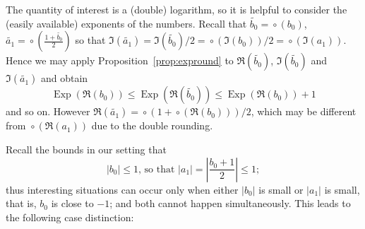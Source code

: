 \documentclass [11pt]{article}
\newcommand {\appro}[1]{\widetilde {#1}}
\DeclareMathOperator{\Exp}{\operatorname {Exp}}
\newcommand {\round}{\operatorname {\circ}}
\renewcommand {\leq}{\leqslant}
\begin{document}
The quantity of interest is a (double) logarithm, so it is helpful to
consider the (easily available) exponents of the numbers. Recall that
$\appro {b_0} = \round ({b_0})$,
$\appro {a_1} = \round \left( \frac {1 + \appro {b_0}}{2} \right)$ so that
$\Im (\appro {a_1}) = \Im (\appro {b_0}) / 2
= \round (\Im (b_0)) / 2 = \round (\Im (a_1))$.
Hence we may apply Proposition~\ref {prop:expround} to $\Re (\appro {b_0})$,
$\Im (\appro {b_0})$ and $\Im (\appro {a_1})$ and obtain
\[
\Exp (\Re (b_0)) \leq \Exp (\Re (\appro {b_0})) \leq \Exp (\Re (b_0)) + 1
\]
and so on.
However
$\Re (\appro {a_1}) = \round (1 + \round (\Re (b_0))) / 2$,
which may be different from $\round (\Re (a_1))$ due to the double rounding.

Recall the bounds in our setting that
\[
|b_0| \leq 1 \text {, so that }
|a_1| = \left| \frac {b_0 + 1}{2} \right| \leq 1;
\]
thus interesting situations can occur only when either
$|b_0|$ is small or $|a_1|$ is small, that is, $b_0$ is close to $-1$;
and both cannot happen simultaneously. This leads to the following
case distinction:
\end{document}
